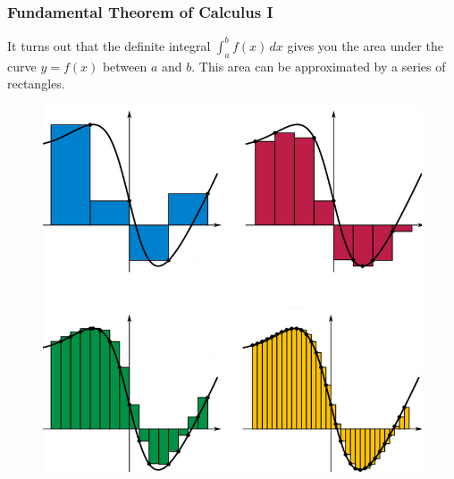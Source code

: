 \documentclass[xcolor=dvipsnames]{beamer}
\begin{document}
\begin{frame}
  \frametitle{Fundamental Theorem of Calculus I}
  It turns out that the definite integral $\int_{a}^{b}f(x)\,dx$ gives
  you the area under the curve $y=f(x)$ between $a$ and $b$. This area
  can be approximated by a series of rectangles.
\begin{figure}[h]
\includegraphics[scale=.3]{./diagrams/ftoc-02.png}
\end{figure}
\end{frame}
\end{document}
